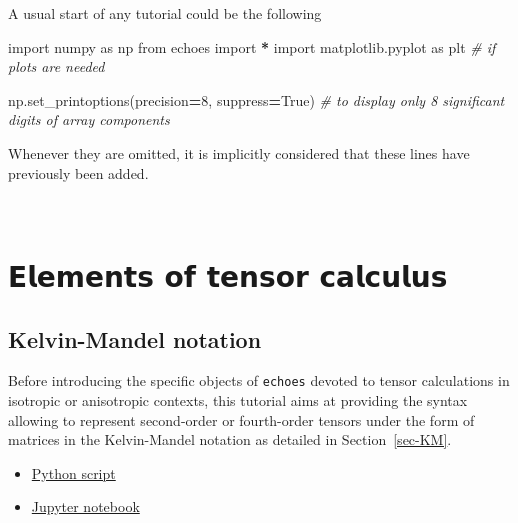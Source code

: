 \documentclass[
  a4paper,
  numbers=noendperiod,
  DIV=12]{scrreprt}
\newenvironment{Shaded}{\begin{snugshade}}{\end{snugshade}}
\newcommand{\CommentTok}[1]{\textcolor[rgb]{0.56,0.35,0.01}{\textit{#1}}}
\newcommand{\DecValTok}[1]{\textcolor[rgb]{0.00,0.00,0.81}{#1}}
\newcommand{\ImportTok}[1]{#1}
\newcommand{\NormalTok}[1]{#1}
\newcommand{\OperatorTok}[1]{\textcolor[rgb]{0.81,0.36,0.00}{\textbf{#1}}}
\newcommand{\VariableTok}[1]{\textcolor[rgb]{0.00,0.00,0.00}{#1}}
\begin{document}
A usual start of any tutorial could be the following

\begin{Shaded}
\begin{Highlighting}[]
\ImportTok{import}\NormalTok{ numpy }\ImportTok{as}\NormalTok{ np}
\ImportTok{from}\NormalTok{ echoes }\ImportTok{import} \OperatorTok{*}
\ImportTok{import}\NormalTok{ matplotlib.pyplot }\ImportTok{as}\NormalTok{ plt }\CommentTok{\# if plots are needed}

\NormalTok{np.set\_printoptions(precision}\OperatorTok{=}\DecValTok{8}\NormalTok{, suppress}\OperatorTok{=}\VariableTok{True}\NormalTok{)}
\CommentTok{\# to display only 8 significant digits of array components}
\end{Highlighting}
\end{Shaded}

Whenever they are omitted, it is implicitly considered that these lines
have previously been added.

\(\,\)

\part{𝗘𝗹𝗲𝗺𝗲𝗻𝘁𝘀 𝗼𝗳 𝘁𝗲𝗻𝘀𝗼𝗿 𝗰𝗮𝗹𝗰𝘂𝗹𝘂𝘀}

\chapter{Kelvin-Mandel notation}\label{sec-kelvin_mandel}

\begin{tcolorbox}[enhanced jigsaw, title={Objectives}, left=2mm, titlerule=0mm, colback=white, breakable, colframe=quarto-callout-important-color-frame, bottomtitle=1mm, toptitle=1mm, rightrule=.15mm, bottomrule=.15mm, coltitle=black, opacitybacktitle=0.6, arc=.35mm, colbacktitle=quarto-callout-important-color!10!white, leftrule=.75mm, opacityback=0, toprule=.15mm]

Before introducing the specific objects of \texttt{echoes} devoted to
tensor calculations in isotropic or anisotropic contexts, this tutorial
aims at providing the syntax allowing to represent second-order or
fourth-order tensors under the form of matrices in the Kelvin-Mandel
notation as detailed in Section~\ref{sec-KM}.

\end{tcolorbox}

\begin{tcolorbox}[enhanced jigsaw, title={Download}, left=2mm, titlerule=0mm, colback=white, breakable, colframe=quarto-callout-note-color-frame, bottomtitle=1mm, toptitle=1mm, rightrule=.15mm, bottomrule=.15mm, coltitle=black, opacitybacktitle=0.6, arc=.35mm, colbacktitle=quarto-callout-note-color!10!white, leftrule=.75mm, opacityback=0, toprule=.15mm]

\begin{itemize}
\item
  \href{kelvin_mandel.py}{Python script}
\item
  \href{kelvin_mandel.ipynb}{Jupyter notebook}
\end{itemize}

\end{tcolorbox}
\end{document}
